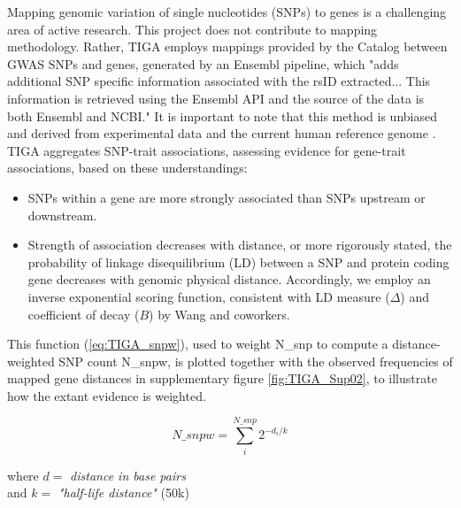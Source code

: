 Mapping  genomic  variation  of  single  nucleotides  (SNPs)  to  genes  is  a  challenging  area  of active  research\cite{Liu2010-fe,Mishra2015-rm,Lamparter2016-zb}.  This project  does not contribute to mapping methodology.  Rather, TIGA employs mappings provided by the Catalog between GWAS SNPs and genes,  generated by an Ensembl pipeline, which "adds additional SNP specific information associated with the rsID extracted... This information is retrieved using the Ensembl API and the source of the data is both Ensembl and NCBI."\cite{The_NHGRI-EBI_GWAS_Catalog_undated-kl} It is important to note that this method is unbiased and derived from experimental data and the current human reference genome . TIGA aggregates SNP-trait associations, assessing evidence for gene-trait associations, based on these understandings:

\begin{itemize}
\item SNPs within a gene are more strongly associated than SNPs upstream or downstream.
\item Strength of association decreases with distance, or more rigorously stated, the probability of linkage disequilibrium (LD) between a SNP and protein coding gene decreases with genomic physical distance. Accordingly, we employ an inverse exponential scoring function, consistent with LD measure ($\Delta$) and coefficient of decay ($B$) by Wang and coworkers\cite{Wang2006-ja}. 
\end{itemize}

This function (\ref{eq:TIGA_snpw}), used to weight N\_snp to compute a distance-weighted SNP count N\_snpw, is plotted together with the observed frequencies of mapped gene distances in supplementary figure \ref{fig:TIGA_Sup02}, to illustrate how the extant evidence is weighted. 

\begin{equation}
    N\_snpw = \sum_{i}^{N\_snp}  2^{-d_{i}/k}
    \label{eq:TIGA_snpw}
\end{equation}

\begin{center}
    where $ d = $ \emph{distance in base pairs}\\
    and $ k = $ \emph{"half-life distance"} (50k)
\end{center}

